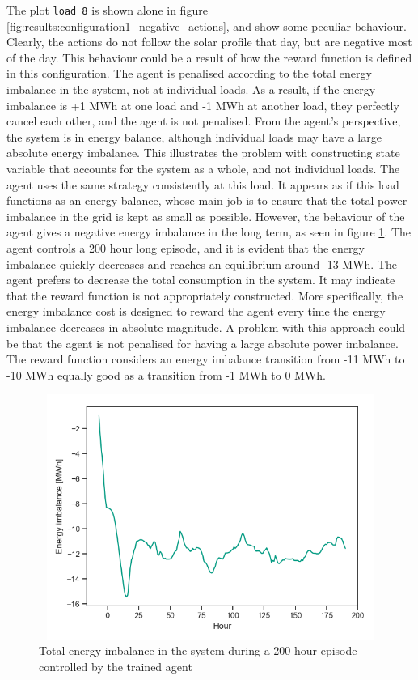 \documentclass[class=book, crop=false]{standalone}
\begin{document}
The plot \texttt{load 8} is shown alone in figure \ref{fig:results:configuration1_negative_actions}, and show some peculiar behaviour. Clearly, the actions do not follow the solar profile that day, but are negative most of the day. This behaviour could be a result of how the reward function is defined in this configuration. The agent is penalised according to the total energy imbalance in the system, not at individual loads. As a result, if the energy imbalance is +1 MWh at one load and -1 MWh at another load, they perfectly cancel each other, and the agent is not penalised. From the agent's perspective, the system is in energy balance, although individual loads may have a large absolute energy imbalance. This illustrates the problem with constructing state variable that accounts for the system as a whole, and not individual loads. The agent uses the same strategy consistently at this load. It appears as if this load functions as an energy balance, whose main job is to ensure that the total power imbalance in the grid is kept as small as possible. However, the behaviour of the agent gives a negative energy imbalance in the long term, as seen in figure \ref{fig:results:configuration1_energy_imbalance}. The agent controls a 200 hour long episode, and it is evident that the energy imbalance quickly decreases and reaches an equilibrium around -13 MWh. The agent prefers to decrease the total consumption in the system. It may indicate that the reward function is not appropriately constructed. More specifically, the energy imbalance cost is designed to reward the agent every time the energy imbalance decreases in absolute magnitude. A problem with this approach could be that the agent is not penalised for having a large absolute power imbalance. The reward function considers an energy imbalance transition from -11 MWh to -10 MWh equally good as a transition from -1 MWh to 0 MWh.
 
\begin{figure}[H]
    \center
\includegraphics[height=8cm, width=12cm]{figures/configuration1_imbalance.png}
    \caption[size = 9]{Total energy imbalance in the system during a 200 hour episode controlled by the trained agent}
    \label{fig:results:configuration1_energy_imbalance}
\end{figure}
\end{document}
